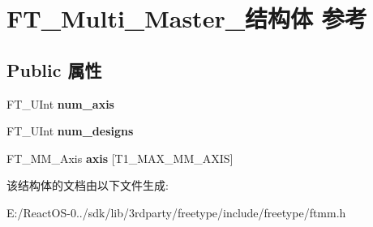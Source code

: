\hypertarget{struct_f_t___multi___master__}{}\section{F\+T\+\_\+\+Multi\+\_\+\+Master\+\_\+结构体 参考}
\label{struct_f_t___multi___master__}
\subsection*{Public 属性}
\begin{DoxyCompactItemize}
\item 
\mbox{\label{struct_f_t___multi___master___a90a0ace4e40b91912259ad52fc86fb6f}} 
F\+T\+\_\+\+U\+Int {\bfseries num\+\_\+axis}
\item 
\mbox{\label{struct_f_t___multi___master___a78b797ee560f4b00795a7dce9656178d}} 
F\+T\+\_\+\+U\+Int {\bfseries num\+\_\+designs}
\item 
\mbox{\label{struct_f_t___multi___master___a1eb062ff3b5ac245ab9421a46b349818}} 
F\+T\+\_\+\+M\+M\+\_\+\+Axis {\bfseries axis} \mbox{[}T1\+\_\+\+M\+A\+X\+\_\+\+M\+M\+\_\+\+A\+X\+IS\mbox{]}
\end{DoxyCompactItemize}


该结构体的文档由以下文件生成\+:\begin{DoxyCompactItemize}
\item 
E\+:/\+React\+O\+S-\/0../sdk/lib/3rdparty/freetype/include/freetype/ftmm.\+h\end{DoxyCompactItemize}

